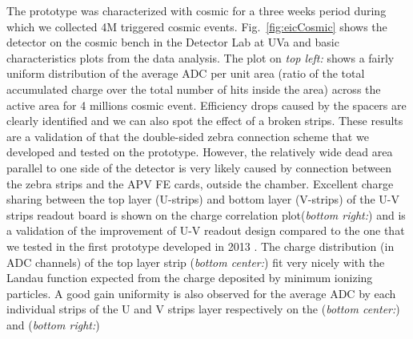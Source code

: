 %
The prototype was characterized with cosmic for a three weeks period during which we collected 4M triggered cosmic events. Fig.~\ref{fig:eicCosmic} shows the detector on the cosmic bench in the Detector Lab at UVa and basic characteristics plots  from the data analysis. The plot on {\it top left:} shows a fairly uniform distribution of the average ADC per unit area (ratio of the total accumulated charge over the total number of hits inside the area)  across  the active area for 4 millions cosmic event. Efficiency drops caused by the spacers are clearly identified and we can also spot the effect of a broken strips. These results are a validation of  that the double-sided zebra connection scheme that we developed and tested on the prototype. However, the relatively wide dead area parallel to one side of the detector is very likely caused by connection between the zebra strips and the APV FE cards, outside the chamber. Excellent charge sharing  between the top layer (U-strips) and bottom layer (V-strips) of the U-V strips readout board  is shown on the charge correlation plot({\it bottom right:}) and is a validation of the improvement of  U-V readout design compared to the one that we tested in the first prototype developed in 2013 \cite{Gnanvo:2015xda}. The  charge distribution (in ADC channels) of the top layer strip ({\it bottom center:}) fit very nicely with the Landau function expected from the charge deposited by minimum ionizing particles. A good gain uniformity is also observed for the average ADC by each individual strips of the U and V strips layer respectively on the ({\it bottom center:}) and  ({\it bottom right:})  
%
%
%
